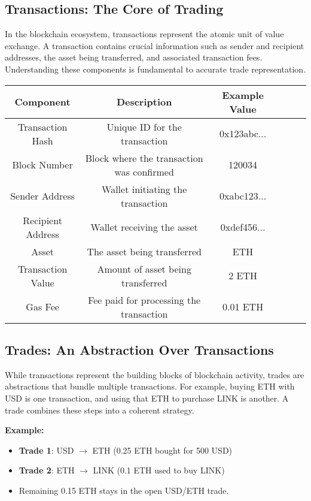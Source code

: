 \documentclass{article}
\begin{document}
\subsection{Transactions: The Core of Trading}
In the blockchain ecosystem, transactions represent the atomic unit of value exchange. A transaction contains crucial information such as sender and recipient addresses, the asset being transferred, and associated transaction fees. Understanding these components is fundamental to accurate trade representation.

\begin{longtable}{|c|c|c|c|c|c|}
\hline
\textbf{Component} & \textbf{Description} & \textbf{Example Value} \\
\hline
Transaction Hash & Unique ID for the transaction & 0x123abc... \\
\hline
Block Number & Block where the transaction was confirmed & 120034 \\
\hline
Sender Address & Wallet initiating the transaction & 0xabc123... \\
\hline
Recipient Address & Wallet receiving the asset & 0xdef456... \\
\hline
Asset & The asset being transferred & ETH \\
\hline
Transaction Value & Amount of asset being transferred & 2 ETH \\
\hline
Gas Fee & Fee paid for processing the transaction & 0.01 ETH \\
\hline
\end{longtable}

\subsection{Trades: An Abstraction Over Transactions}
While transactions represent the building blocks of blockchain activity, trades are abstractions that bundle multiple transactions. For example, buying ETH with USD is one transaction, and using that ETH to purchase LINK is another. A trade combines these steps into a coherent strategy.

\textbf{Example:}
\begin{itemize}
    \item \textbf{Trade 1}: USD $\rightarrow$ ETH (0.25 ETH bought for 500 USD)
    \item \textbf{Trade 2}: ETH $\rightarrow$ LINK (0.1 ETH used to buy LINK)
    \item Remaining 0.15 ETH stays in the open USD/ETH trade.
\end{itemize}
\end{document}
